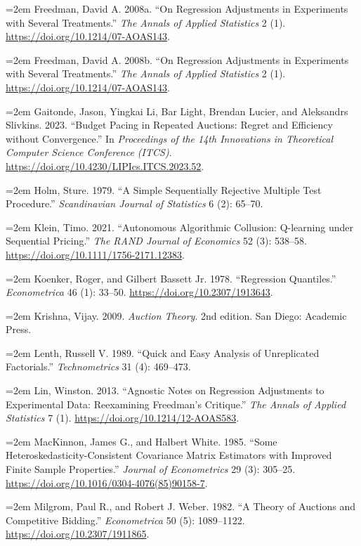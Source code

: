 \hangindent=2em Freedman, David A. 2008a. ``On Regression Adjustments in Experiments with Several Treatments.'' \textit{The Annals of Applied Statistics} 2 (1). \url{https://doi.org/10.1214/07-AOAS143}.

\hangindent=2em Freedman, David A. 2008b. ``On Regression Adjustments in Experiments with Several Treatments.'' \textit{The Annals of Applied Statistics} 2 (1). \url{https://doi.org/10.1214/07-AOAS143}.

\hangindent=2em Gaitonde, Jason, Yingkai Li, Bar Light, Brendan Lucier, and Aleksandrs Slivkins. 2023. ``Budget Pacing in Repeated Auctions: Regret and Efficiency without Convergence.'' In \textit{Proceedings of the 14th Innovations in Theoretical Computer Science Conference (ITCS)}. \url{https://doi.org/10.4230/LIPIcs.ITCS.2023.52}.

\hangindent=2em Holm, Sture. 1979. ``A Simple Sequentially Rejective Multiple Test Procedure.'' \textit{Scandinavian Journal of Statistics} 6 (2): 65--70.

\hangindent=2em Klein, Timo. 2021. ``Autonomous Algorithmic Collusion: Q-learning under Sequential Pricing.'' \textit{The RAND Journal of Economics} 52 (3): 538--58. \url{https://doi.org/10.1111/1756-2171.12383}.

\hangindent=2em Koenker, Roger, and Gilbert Bassett Jr. 1978. ``Regression Quantiles.'' \textit{Econometrica} 46 (1): 33--50. \url{https://doi.org/10.2307/1913643}.

\hangindent=2em Krishna, Vijay. 2009. \textit{Auction Theory}. 2nd edition. San Diego: Academic Press.

\hangindent=2em Lenth, Russell V. 1989. ``Quick and Easy Analysis of Unreplicated Factorials.'' \textit{Technometrics} 31 (4): 469--473.

\hangindent=2em Lin, Winston. 2013. ``Agnostic Notes on Regression Adjustments to Experimental Data: Reexamining Freedman's Critique.'' \textit{The Annals of Applied Statistics} 7 (1). \url{https://doi.org/10.1214/12-AOAS583}.

\hangindent=2em MacKinnon, James G., and Halbert White. 1985. ``Some Heteroskedasticity-Consistent Covariance Matrix Estimators with Improved Finite Sample Properties.'' \textit{Journal of Econometrics} 29 (3): 305--25. \url{https://doi.org/10.1016/0304-4076(85)90158-7}.

\hangindent=2em Milgrom, Paul R., and Robert J. Weber. 1982. ``A Theory of Auctions and Competitive Bidding.'' \textit{Econometrica} 50 (5): 1089--1122. \url{https://doi.org/10.2307/1911865}.

